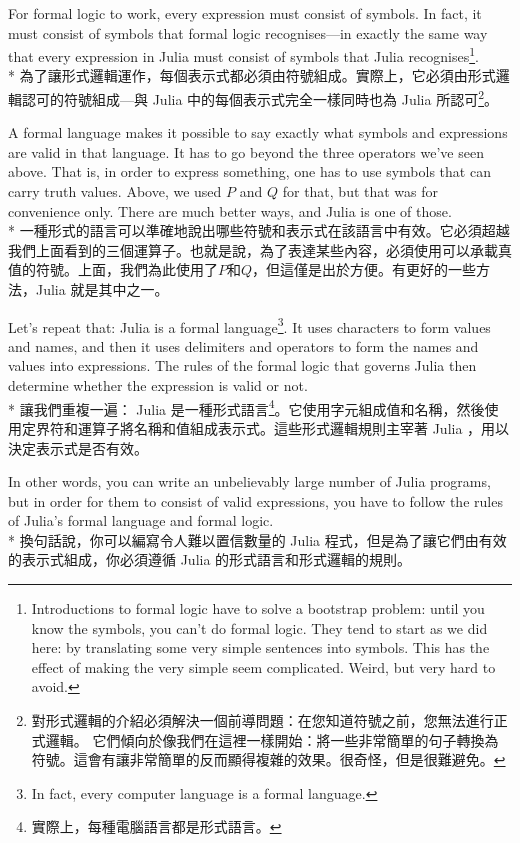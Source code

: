 \documentclass[]{article}
\begin{document}
{\color{gray}For formal logic to work, every expression must consist of symbols. In fact, it must consist of symbols that formal logic recognises---in exactly the same way that every expression in Julia must consist of symbols that Julia recognises\footnote{Introductions to formal logic have to solve a bootstrap problem: until you know the symbols, you can't do formal logic. They tend to start as we did here: by translating some very simple sentences into symbols. This has the effect of making the very simple seem complicated. Weird, but very hard to avoid.}.}
\\*
{為了讓形式邏輯運作，每個表示式都必須由符號組成。實際上，它必須由形式邏輯認可的符號組成---與 Julia 中的每個表示式完全一樣同時也為 Julia 所認可\footnote{對形式邏輯的介紹必須解決一個前導問題：在您知道符號之前，您無法進行正式邏輯。 它們傾向於像我們在這裡一樣開始：將一些非常簡單的句子轉換為符號。這會有讓非常簡單的反而顯得複雜的效果。很奇怪，但是很難避免。}。}

{\color{gray}A formal language makes it possible to say exactly what symbols and expressions are valid in that language. It has to go beyond the three operators we've seen above. That is, in order to express something, one has to use symbols that can carry truth values. Above, we used $ P $ and $ Q $ for that, but that was for convenience only. There are much better ways, and Julia is one of those.
}
\\*
{一種形式的語言可以準確地說出哪些符號和表示式在該語言中有效。它必須超越我們上面看到的三個運算子。也就是說，為了表達某些內容，必須使用可以承載真值的符號。上面，我們為此使用了$ P $和$ Q $，但這僅是出於方便。有更好的一些方法，Julia 就是其中之一。
}

{\color{gray}Let's repeat that: Julia is a formal language\footnote{In fact, every computer language is a formal language.}. It uses characters to form values and names, and then it uses delimiters and operators to form the names and values into expressions. The rules of the formal logic that governs Julia then determine whether the expression is valid or not.}
\\*
{讓我們重複一遍： Julia 是一種形式語言\footnote{實際上，每種電腦語言都是形式語言。}。它使用字元組成值和名稱，然後使用定界符和運算子將名稱和值組成表示式。這些形式邏輯規則主宰著 Julia ，用以決定表示式是否有效。}

{\color{gray}In other words, you can write an unbelievably large number of Julia programs, but in order for them to consist of valid expressions, you have to follow the rules of Julia's formal language and formal logic.}
\\*
{換句話說，你可以編寫令人難以置信數量的 Julia 程式，但是為了讓它們由有效的表示式組成，你必須遵循 Julia 的形式語言和形式邏輯的規則。}
\end{document}
